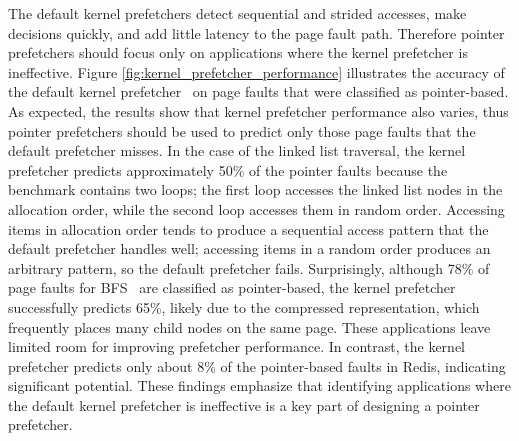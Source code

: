 The default kernel prefetchers detect sequential and strided accesses, make decisions quickly, and add little latency to the page fault path. Therefore pointer prefetchers should focus only on applications where the kernel prefetcher is ineffective. Figure \ref{fig:kernel_prefetcher_performance} illustrates the accuracy of the default kernel prefetcher~\cite{vma-readahead} on page faults that were classified as pointer-based. As expected, the results show that kernel prefetcher performance also varies, thus pointer prefetchers should be used to predict only those page faults that the default prefetcher misses. In the case of the linked list traversal, the kernel prefetcher predicts approximately 50\% of the pointer faults because the benchmark contains two loops; the first loop accesses the linked list nodes in the allocation order, while the second loop accesses them in random order. Accessing items
in allocation order tends to produce a sequential access pattern that the default prefetcher handles well; accessing items in a random order produces an arbitrary pattern, so the default prefetcher fails. Surprisingly, although 78\% of page faults for BFS~\cite{gapbs} are classified as pointer-based, the kernel prefetcher successfully predicts 65\%, likely due to the compressed representation, which frequently places many child nodes on the same page. These applications leave limited room for improving prefetcher performance. In contrast, the kernel prefetcher predicts only about 8\% of the pointer-based faults in Redis, indicating significant potential. These findings emphasize that identifying applications where the default kernel prefetcher is ineffective is a key part of designing a pointer prefetcher.

